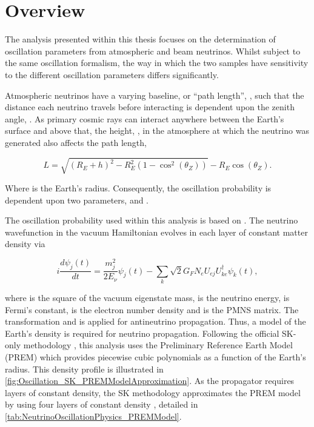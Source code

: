 \section{Overview}
\label{sec:Oscillation_Overview}


The analysis presented within this thesis focuses on the determination of oscillation parameters from atmospheric and beam neutrinos. Whilst subject to the same oscillation formalism, the way in which the two samples have sensitivity to the different oscillation parameters differs significantly.

Atmospheric neutrinos have a varying baseline, or ``path length'', , such that the distance each neutrino travels before interacting is dependent upon the zenith angle, . As primary cosmic rays can interact anywhere between the Earth's surface and  above that, the height, , in the atmosphere at which the neutrino was generated also affects the path length,

\begin{equation}
  L = \sqrt{\left(R_{E} + h\right)^{2} - R_{E}^{2} \left(1 - \cos^{2} \left(\theta_{Z} \right) \right)} - R_{E}\cos(\theta_{Z}).
\end{equation}

Where  is the Earth's radius. Consequently, the oscillation probability is dependent upon two parameters,  and .

The oscillation probability used within this analysis is based on \cite{Barger:1980tf}. The neutrino wavefunction in the vacuum Hamiltonian evolves in each layer of constant matter density via

\begin{equation}
  i \frac{d\psi_{j}(t)}{dt} = \frac{m_{j}^{2}}{2E_{\nu}} \psi_{j}(t) - \sum_{k} \sqrt{2} G_{F} N_{e} U_{ej} U_{ke}^{\dagger} \psi_{k}(t),
\end{equation}

where  is the square of the  vacuum eigenstate mass,  is the neutrino energy,  is Fermi's constant,  is the electron number density and  is the PMNS matrix. The transformation  and  is applied for antineutrino propagation. Thus, a model of the Earth's density is required for neutrino propagation. Following the official SK-only methodology \cite{thesis_roger}, this analysis uses the Preliminary Reference Earth Model (PREM) \cite{Dziewonski1981-sp} which provides piecewise cubic polynomials as a function of the Earth's radius. This density profile is illustrated in \autoref{fig:Oscillation_SK_PREMModelApproximation}. As the propagator requires layers of constant density, the SK methodology approximates the PREM model by using four layers of constant density \cite{thesis_roger}, detailed in \autoref{tab:NeutrinoOscillationPhysics_PREMModel}.

